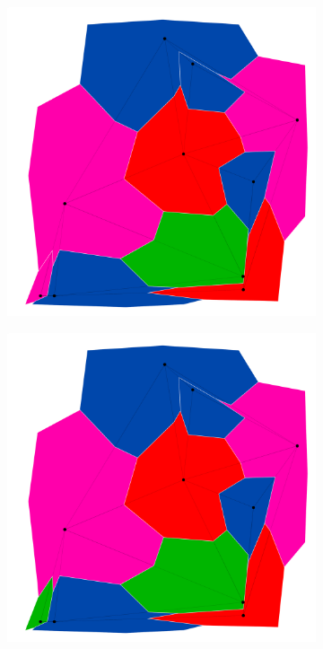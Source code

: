 \documentclass{article}
\begin{document}
\begin{figure}[h!]
\begin{subfigure}{0.18\textwidth}
				\caption{}
				\label{minb}
			\end{subfigure}
			\;
			\begin{subfigure}{0.18\textwidth}
				\centering
				\includegraphics[width=\textwidth]{images/sequences/min/minconf_I00005}
				\caption{}
				\label{minc}
			\end{subfigure}
			\;
			\begin{subfigure}{0.18\textwidth}
				\centering
				\includegraphics[width=\textwidth]{images/sequences/min/minconf_I00006}

\end{subfigure}
\end{figure}
\end{document}
